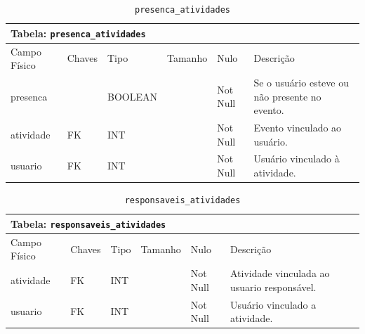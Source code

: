 \documentclass[12pt,a4paper]{article}
\begin{document}
\begin{center}
\begin{table}[h!]
	\caption{\texttt{presenca\_atividades}}
	\label{tabela:presencaAtividades}
	\begin{tabular}{|p{2.3cm}|p{1.2cm}|p{1.8cm}|p{1.5cm}|p{1cm}|p{6cm}|}\hline	
		\multicolumn{6}{|p{16cm}|}{\cellcolor{cinzaClaro}  \centering Tabela: \texttt{presenca\_atividades}} \\ \hline %
		{\small Campo Físico}   & {\small Chaves} & {\small Tipo} & {\small Tamanho} & {\small Nulo} & {\small Descrição}\\\hline %
		
		{\tiny presenca} & {\tiny } & {\tiny BOOLEAN} & {\tiny } & {\tiny Not Null} &{\tiny Se o usuário esteve ou não presente no evento.}\\\hline
		{\tiny atividade}  & {\tiny FK} & {\tiny INT} & {\tiny } & {\tiny Not Null} &{\tiny Evento vinculado ao usuário.}\\\hline
		{\tiny usuario}  & {\tiny FK} & {\tiny INT} & {\tiny } & {\tiny Not Null} &{\tiny Usuário vinculado à atividade.}\\\hline
			
	\end{tabular}
\end{table}	
\end{center}


\begin{center}
\begin{table}[h!]
	\caption{\texttt{responsaveis\_atividades}}
	\label{tabela:responsaveisAtividades}
	\begin{tabular}{|p{2.3cm}|p{1.2cm}|p{1.8cm}|p{1.5cm}|p{1cm}|p{6cm}|}\hline	
		\multicolumn{6}{|p{16cm}|}{\cellcolor{cinzaClaro}  \centering Tabela: \texttt{responsaveis\_atividades}} \\ \hline %
		{\small Campo Físico}   & {\small Chaves} & {\small Tipo} & {\small Tamanho} & {\small Nulo} & {\small Descrição}\\\hline %
		
		{\tiny atividade}  & {\tiny FK} & {\tiny INT} & {\tiny } & {\tiny Not Null} &{\tiny Atividade vinculada ao usuario responsável.}\\\hline
		{\tiny usuario} & {\tiny FK} & {\tiny INT} & {\tiny } & {\tiny Not Null} &{\tiny Usuário vinculado a atividade.}\\\hline
			
	\end{tabular}
\end{table}	
\end{center}
\end{document}

